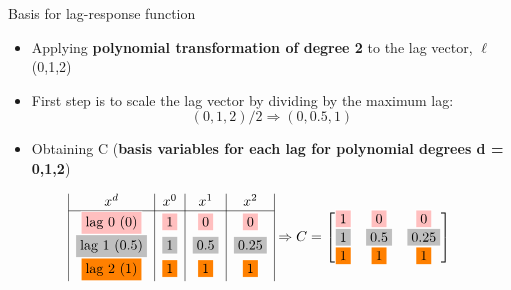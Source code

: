 \documentclass[english]{beamer}
\newcommand{\alertblue}[1]{{\color{blue}#1}}
\begin{document}
\begin{frame}{Basis for lag-response function}
    \begin{itemize}
        \item Applying \alertblue{\textbf{polynomial transformation of degree 2}} to the lag vector, \(\ell\)(0,1,2)
        \item First step is to scale the lag vector by dividing by the maximum lag:
        \[
        (0,1,2)/2 \Rightarrow (0, 0.5, 1)
        \]
        \item Obtaining \alertblue{C} (\alertblue{\textbf{basis variables for each lag for polynomial degrees d = 0,1,2}})
    \end{itemize}
    \vspace{0.5cm}
\[
\begin{array}{|c|c|c|c|}
        x^d & x^0 & x^1 & x^2 \\ \hline
        \fcolorbox{white}{pink}{lag 0 (0)} & \fcolorbox{white}{pink}{1}  & \fcolorbox{white}{pink}{0}   & \fcolorbox{white}{pink}{0}   \\
        \fcolorbox{white}{lightgray}{lag 1 (0.5)} & \fcolorbox{white}{lightgray}{1}  & \fcolorbox{white}{lightgray}{0.5} & \fcolorbox{white}{lightgray}{0.25} \\
        \fcolorbox{white}{orange}{lag 2 (1)} & \fcolorbox{white}{orange}{1}  & \fcolorbox{white}{orange}{1}   & \fcolorbox{white}{orange}{1}  
\end{array}
\Rightarrow C = 
\begin{bmatrix}
        \fcolorbox{white}{pink}{1} & \fcolorbox{white}{pink}{0} & \fcolorbox{white}{pink}{0} \\
        \fcolorbox{white}{lightgray}{1} & \fcolorbox{white}{lightgray}{0.5} & \fcolorbox{white}{lightgray}{0.25} \\
        \fcolorbox{white}{orange}{1} & \fcolorbox{white}{orange}{1} & \fcolorbox{white}{orange}{1}
\end{bmatrix}
\]
\end{frame}
\end{document}
